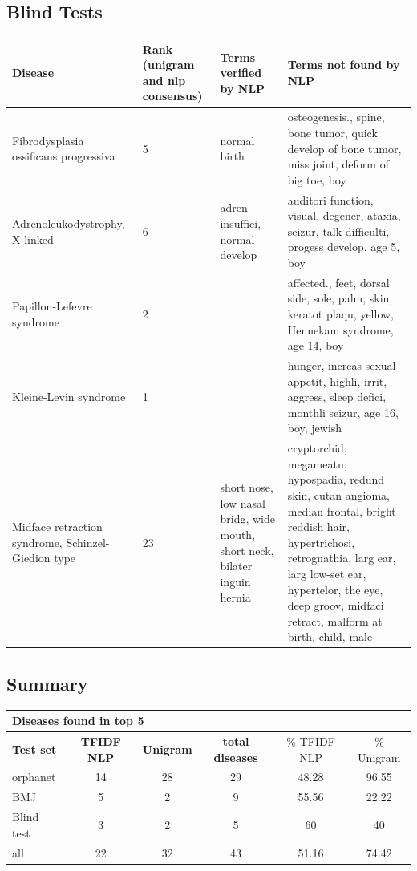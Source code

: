 \documentclass[10pt,letterpaper,final]{article}
\begin{document}
\subsection{Blind Tests}
\label{app:blind_tfidf_tfidfrecalc}
\begin{center}
\begin{small}
	\begin{longtable}{|p{3.5cm}|p{1.5cm}|p{3cm}|p{3cm}|}
	\hline
	\textbf{Disease}  & \textbf{Rank (unigram and nlp consensus)} & \textbf{Terms verified by NLP}  & \textbf{Terms not found by NLP} \\
	\hline\hline
Fibrodysplasia ossificans progressiva & 5 & normal birth & osteogenesis., spine, bone tumor, quick develop of bone tumor, miss joint, deform of big toe, boy \\ \hline
Adrenoleukodystrophy, X-linked & 6 & adren insuffici, normal develop & auditori function, visual, degener, ataxia, seizur, talk difficulti, progess develop, age 5, boy \\ \hline
Papillon-Lefevre syndrome & 2 &  & affected., feet, dorsal side, sole, palm, skin, keratot plaqu, yellow, Hennekam syndrome, age 14, boy \\ \hline
Kleine-Levin syndrome & 1 &  & hunger, increas sexual appetit, highli, irrit, aggress, sleep defici, monthli seizur, age 16, boy, jewish \\ \hline
Midface retraction syndrome, Schinzel-Giedion type & 23 & short nose, low nasal bridg, wide mouth, short neck, bilater inguin hernia & cryptorchid, megameatu, hypospadia, redund skin, cutan angioma, median frontal, bright reddish hair, hypertrichosi, retrognathia, larg ear, larg low-set ear, hypertelor, the eye, deep groov, midfaci retract, malform at birth, child, male \\ \hline
	\end{longtable}
\end{small}
\end{center}

\subsection{Summary}
\label{app:summary_tfidf_tfidfrecalc}

\begin{center}
\begin{small}
\begin{tabular}{l|cc||ccc}
	\multicolumn{6}{l}{\textbf{Diseases found in top 5}} \\ \hline
\textbf{Test set} & \textbf{TFIDF NLP} &	\textbf{Unigram}	 &	\textbf{total diseases} &	\% TFIDF NLP	 &\% Unigram \\ \hline
orphanet    &   14    &  28    &    29   & 48.28     & 96.55\\
BMJ	        &    5   &    2  &     9  &   55.56   & 22.22\\
Blind test	&    3   &    2  &     5  &   60   & 40 \\ \hline \hline
all	        &    22   &   32   &    43   &  51.16    & 74.42\\ \hline
\end{tabular}
\end{small}
\end{center}
\end{document}
